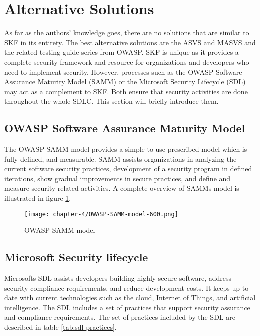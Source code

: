 \section{Alternative Solutions}
As far as the authors' knowledge goes, there are no solutions that are similar to SKF in its entirety. The best alternative solutions are the ASVS and MASVS and the related testing guide series from OWASP. SKF is unique as it provides a complete security framework and resource for organizations and developers who need to implement security. However, processes such as the OWASP Software Assurance Maturity Model (SAMM) or the Microsoft Security Lifecycle (SDL) may act as a complement to SKF. Both ensure that security activities are done throughout the whole SDLC. This section will briefly introduce them.

\subsection{OWASP Software Assurance Maturity Model}
The OWASP SAMM model provides a simple to use prescribed model which is fully defined, and measurable. SAMM assists organizations in analyzing the current software security practices, development of a security program in defined iterations, show gradual improvements in secure practices, and define and measure security-related activities. A complete overview of SAMMs model is illustrated in figure \ref{fig:samm-model}.

\begin{figure}[!h]
    \centering
    \caption{OWASP SAMM model}
    \label{fig:samm-model}
    \texttt{[image: chapter-4/OWASP-SAMM-model-600.png]}
\end{figure}

\subsection{Microsoft Security lifecycle}
Microsofts SDL assists developers building highly secure software, address security compliance requirements, and reduce development costs. It keeps up to date with current technologies such as the cloud, Internet of Things, and artificial intelligence. The SDL includes a set of practices that support security assurance and compliance requirements. The set of practices included by the SDL are described in table \ref{tab:sdl-practices}.

